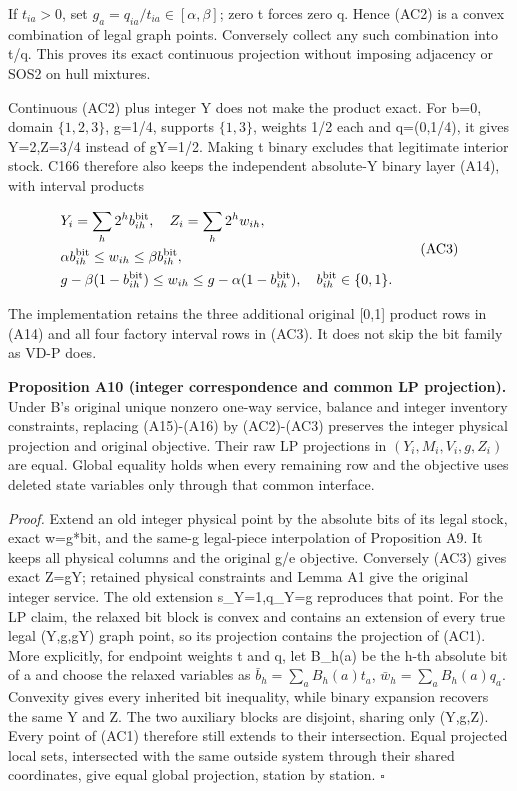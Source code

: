 \documentclass[
  american,
  11pt,
]{article}
\begin{document}
If \(t_{ia}>0\), set \(g_a=q_{ia}/t_{ia}\in[\alpha,\beta]\); zero t
forces zero q. Hence (AC2) is a convex combination of legal graph
points. Conversely collect any such combination into t/q. This proves
its exact continuous projection without imposing adjacency or SOS2 on
hull mixtures.

Continuous (AC2) plus integer Y does not make the product exact. For
b=0, domain \(\{1,2,3\}\), g=1/4, supports \(\{1,3\}\), weights 1/2 each
and q=(0,1/4), it gives Y=2,Z=3/4 instead of gY=1/2. Making t binary
excludes that legitimate interior stock. C166 therefore also keeps the
independent absolute-Y binary layer (A14), with interval products

\[
\begin{aligned}
&Y_i=\sum_h2^h b_{ih}^{\rm bit},\quad Z_i=\sum_h2^h w_{ih},\\
&\alpha b_{ih}^{\rm bit}\le w_{ih}\le\beta b_{ih}^{\rm bit},\\
&g-\beta(1-b_{ih}^{\rm bit})\le w_{ih}\le
g-\alpha(1-b_{ih}^{\rm bit}),\quad b_{ih}^{\rm bit}\in\{0,1\}.
\end{aligned}
\tag{AC3}
\]

The implementation retains the three additional original {[}0,1{]}
product rows in (A14) and all four factory interval rows in (AC3). It
does not skip the bit family as VD-P does.


\textbf{Proposition A10 (integer correspondence and common LP
projection).} Under B's original unique nonzero one-way service, balance
and integer inventory constraints, replacing (A15)-(A16) by (AC2)-(AC3)
preserves the integer physical projection and original objective. Their
raw LP projections in \((Y_i,M_i,V_i,g,Z_i)\) are equal. Global equality
holds when every remaining row and the objective uses deleted state
variables only through that common interface.

\emph{Proof.} Extend an old integer physical point by the absolute bits
of its legal stock, exact w=g*bit, and the same-g legal-piece
interpolation of Proposition A9. It keeps all physical columns and the
original g/e objective. Conversely (AC3) gives exact Z=gY; retained
physical constraints and Lemma A1 give the original integer service. The
old extension s\_\allowbreak{}Y=1,q\_\allowbreak{}Y=g reproduces that point. For the LP claim, the
relaxed bit block is convex and contains an extension of every true
legal (Y,g,gY) graph point, so its projection contains the projection of
(AC1). More explicitly, for endpoint weights t and q, let B\_\allowbreak{}h(a) be the
h-th absolute bit of a and choose the relaxed variables as
\(\bar b_h=\sum_a B_h(a)t_a\), \(\bar w_h=\sum_a B_h(a)q_a\). Convexity
gives every inherited bit inequality, while binary expansion recovers
the same Y and Z. The two auxiliary blocks are disjoint, sharing only
(Y,g,Z). Every point of (AC1) therefore still extends to their
intersection. Equal projected local sets, intersected with the same
outside system through their shared coordinates, give equal global
projection, station by station. \(\square\)
\end{document}
